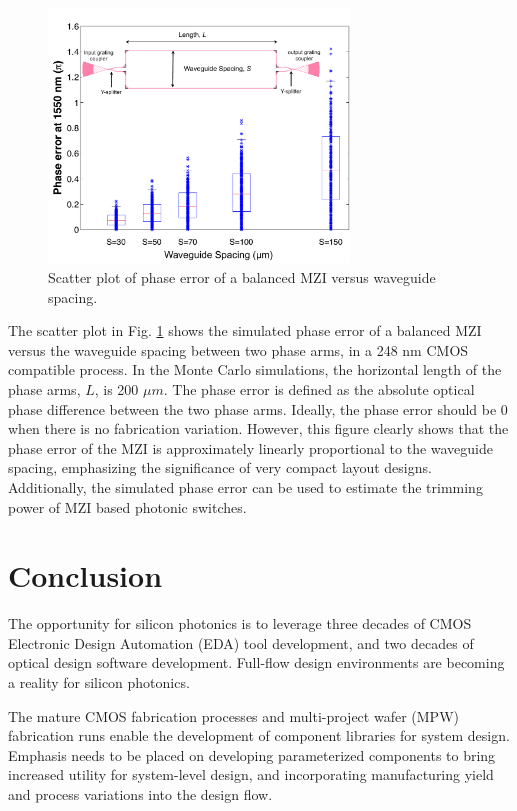\documentclass[journal]{spie}
\begin{document}
\begin{figure}[t]
    \centering
    \label{error}\includegraphics[width=8cm]{error.pdf}
    \caption{Scatter plot of phase error of a balanced MZI versus waveguide spacing.} 
    \label{error}
\end{figure}


The scatter plot in Fig. \ref{error} shows the simulated phase error of a balanced MZI versus the waveguide spacing between two phase arms, in a 248 nm CMOS compatible process. In the Monte Carlo simulations, the horizontal length of the phase arms, $L$,  is 200 $\mu m$. The phase error is defined as the absolute optical phase difference between the two phase arms. Ideally, the phase error should be 0 when there is no fabrication variation. However, this figure clearly shows that the phase error of the MZI is approximately linearly proportional to the waveguide spacing, emphasizing the significance of very compact layout designs. Additionally, the simulated phase error can be used to estimate the trimming power of MZI based photonic switches. 



\section{Conclusion}\label{sec6}

The opportunity for silicon photonics is to leverage three decades of CMOS Electronic Design Automation (EDA) tool development, and two decades of optical design software development.
Full-flow design environments are becoming a reality for silicon photonics.

The mature CMOS fabrication processes and multi-project wafer (MPW) fabrication runs 
enable the development of component libraries for system design.  Emphasis needs to be placed on developing parameterized components to bring increased utility for system-level design, and incorporating manufacturing yield and process variations into the design flow.  
\end{document}
